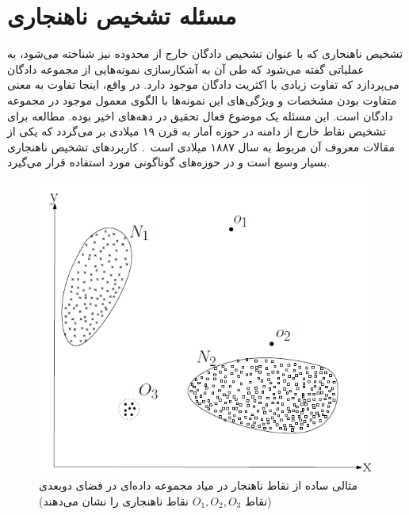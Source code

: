 \documentclass[12pt,a4paper]{report}
\theoremstyle{definition}
\theoremstyle{definition}
\begin{document}
	\section{مسئله تشخیص ناهنجاری}
تشخیص ناهنجاری که با عنوان تشخیص دادگان خارج از محدوده نیز شناخته می‌شود، به عملیاتی گفته می‌شود که طی آن به آشکارسازی نمونه‌هایی از مجموعه دادگان می‌پردازد که تفاوت زیادی با اکثریت دادگان موجود دارد. در واقع، اینجا تفاوت به معنی متفاوت بودن مشخصات و ویژگی‌های این نمونه‌ها با الگوی معمول موجود در مجموعه دادگان است. این مسئله یک موضوع فعال تحقیق در دهه‌های اخیر بوده. مطالعه برای تشخیص نقاط خارج از دامنه در حوزه آمار به قرن ۱۹ میلادی بر می‌گردد که یکی از مقالات معروف آن مربوط به سال ۱۸۸۷ میلادی است~\cite{Grubbs1969ProceduresFD}. کاربردهای تشخیص ناهنجاری بسیار وسیع است و در حوزه‌های گوناگونی مورد استفاده قرار می‌گیرد.\\

\begin{figure}[!hp]
	\begin{center}
		\includegraphics[width=0.5\linewidth]{./images/figures/anomaly-2d.png}

		\caption{
		مثالی ساده از نقاط ناهنجار در میاد مجموعه داده‌ای در فضای دوبعدی (نقاط 
$O_1, O_2, O_3$
نقاط ناهنجاری را نشان می‌دهند)
		\cite{V.Chandola}
		}		
		\label{fig:anomaly-example-1}
		\centering
	\end{center}
\end{figure}
\end{document}
